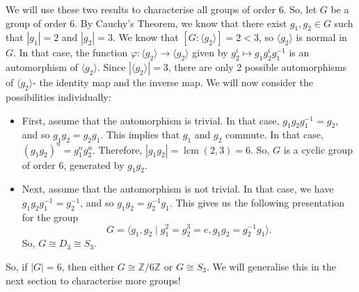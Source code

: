 \documentclass[a4paper, openany]{memoir}
\theoremstyle{definition}
\theoremstyle{plain}
\begin{document}
\noindent We will use these two results to characterise all groups of order 6. So, let $G$ be a group of order 6. By Cauchy's Theorem, we know that there exist $g_1, g_2 \in G$ such that $|g_1| = 2$ and $|g_2| = 3$. We know that $[G: \langle g_2 \rangle] = 2 < 3$, so $\langle g_2 \rangle$ is normal in $G$. In that case, the function $\varphi: \langle g_2 \rangle \to \langle g_2 \rangle$ given by $g_2^i \mapsto g_1 g_2^i g_1^{-1}$ is an automorphism of $\langle g_2 \rangle$. Since $|\langle g_2 \rangle| = 3$, there are only 2 possible automorphisms of $\langle g_2 \rangle$- the identity map and the inverse map. We will now consider the possibilities individually:
\begin{itemize}
    \item First, assume that the automorphism is trivial. In that case, $g_1 g_2 g_1^{-1} = g_2$, and so $g_1 g_2 = g_2 g_1$. This implies that $g_1$ and $g_2$ commute. In that case, $(g_1g_2)^n = g_1^n g_2^n$. Therefore, $|g_1 g_2| = \operatorname{lcm}(2, 3) = 6$. So, $G$ is a cyclic group of order $6$, generated by $g_1 g_2$.
    
    \item Next, assume that the automorphism is not trivial. In that case, we have $g_1 g_2 g_1^{-1} = g_2^{-1}$, and so $g_1g_2 = g_2^{-1}g_1$. This gives us the following presentation for the group
    \[G = \langle g_1, g_2 \mid g_1^2 = g_2^3 = e, g_1g_2 = g_2^{-1}g_1 \rangle.\]
    So, $G \cong D_3 \cong S_3$.
\end{itemize}
So, if $|G| = 6$, then either $G \cong \mathbb{Z}/6 \mathbb{Z}$ or $G \cong S_3$. We will generalise this in the next section to characterise more groups!
\end{document}
